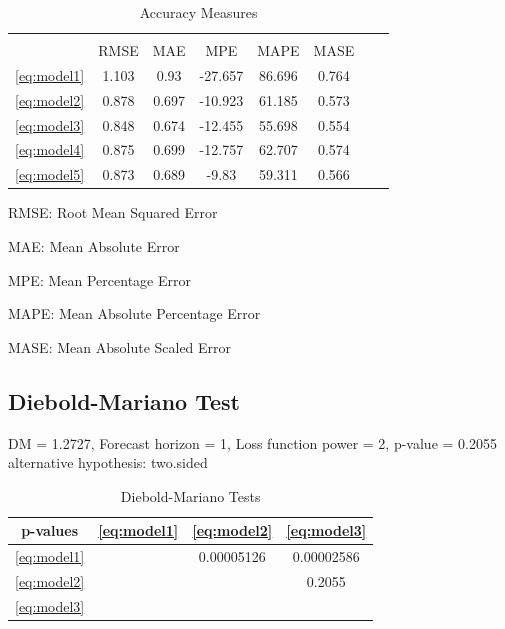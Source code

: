 \documentclass[12pt,a4paper,oneside]{book}
\begin{document}
\begin{table}[!htbp]
    \centering \footnotesize
\begin{tabular}{@{\extracolsep{5pt}} cccccccc} 
\\[-1.8ex]\hline 
\hline \\[-1.8ex] 
                 & RMSE & MAE & MPE & MAPE & MASE \\ \hline
\autoref{eq:model1} & 1.103 &0.93 &-27.657 & 86.696 & 0.764 \\
\autoref{eq:model2} & 0.878 &0.697 & -10.923 & 61.185 & 0.573 \\
\autoref{eq:model3} & 0.848 &0.674 & -12.455 & 55.698 & 0.554 \\
\autoref{eq:model4} & 0.875 &0.699 & -12.757 & 62.707 & 0.574 \\
\autoref{eq:model5} & 0.873 &0.689 & -9.83 & 59.311 & 0.566 \\ \hline
    \end{tabular}
    \caption{Accuracy Measures}
    \label{tab:accuracy measures}
\end{table}


RMSE: Root Mean Squared Error

MAE: Mean Absolute Error

MPE: Mean Percentage Error

MAPE: Mean Absolute Percentage Error

MASE: Mean Absolute Scaled Error

\subsection{Diebold-Mariano Test}

\cite{diebold_comparing_1995}

DM = 1.2727, Forecast horizon = 1, Loss function power = 2, p-value = 0.2055
alternative hypothesis: two.sided


\begin{table}[!htbp]
    \centering \footnotesize
    \begin{tabular}{c|c|c|c}
        p-values & \autoref{eq:model1} & \autoref{eq:model2} & \autoref{eq:model3} \\ \hline
        \autoref{eq:model1} &    & 0.00005126  & 0.00002586    \\
        \autoref{eq:model2} &    &        & 0.2055        \\
        \autoref{eq:model3} &    &        &      \\
    \end{tabular}
    \caption{Diebold-Mariano Tests}
    \label{tab:Diebold-Mariano}
\end{table}
\end{document}
